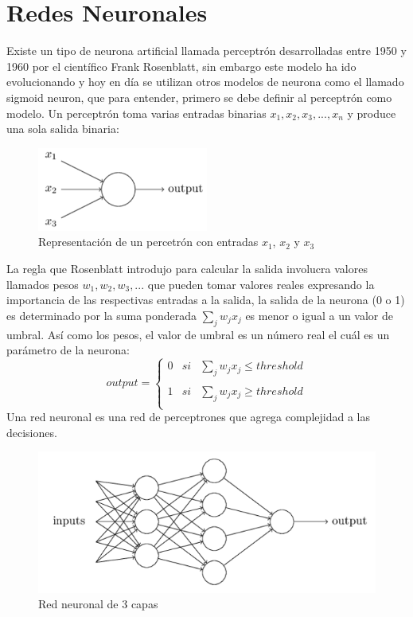 \section{Redes Neuronales}
    Existe un tipo de neurona artificial llamada perceptrón desarrolladas entre 1950 y 1960 por el científico Frank Rosenblatt, sin embargo este modelo ha ido evolucionando y hoy en día se utilizan otros modelos de neurona como el llamado sigmoid neuron, que para entender, primero se debe definir al perceptrón como modelo.
    Un perceptrón toma varias entradas binarias $x_{1},x_{2},x_{3},...,x_{n}$ y produce una sola salida binaria:
     \begin{figure}[H]
        \centering
        \includegraphics[width=0.5\textwidth]{capitulo2/images/perceptron.PNG}
        \caption{Representación de un percetrón con entradas $x_{1}$, $x_{2}$ y $x_{3}$}
        \label{fig:perceptron}
    \end{figure}
    La regla que Rosenblatt introdujo para calcular la salida involucra valores llamados pesos $w_{1},w_{2},w_{3},...$ que pueden tomar valores reales expresando la importancia de las respectivas entradas a la salida, la salida de la neurona (0 o 1) es determinado por la suma ponderada $\sum_{j} w_{j} x_{j}$ es menor o igual a un valor de umbral. Así como los pesos, el valor de umbral es un número real el cuál es un parámetro de la neurona:
     \begin{equation}
        output = \left\{ \begin{array}{lcc}
             0 &   si  & \sum_{j} w_{j} x_{j} \leq threshold \\
             \\ 1 &  si & \sum_{j} w_{j} x_{j} \ge threshold\\
             \end{array}
        \right.
    \end{equation}
    \newpage
    Una red neuronal es una red de perceptrones que agrega complejidad a las decisiones.
    \begin{figure}[H]
        \centering
        \includegraphics[width=1\textwidth]{capitulo2/images/NNmodel.PNG}
        \caption{Red neuronal de 3 capas}
        \label{fig:NNmodel}
    \end{figure}

